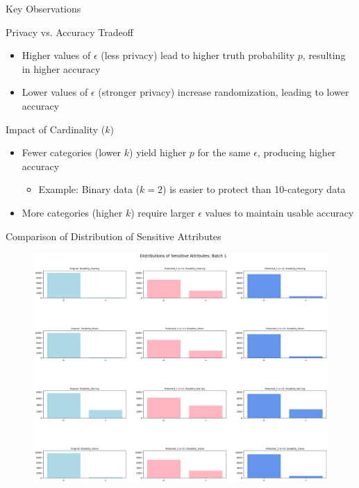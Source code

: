 \documentclass{beamer}
\begin{document}
\begin{frame}{Key Observations}
\footnotesize

\begin{block}{Privacy vs. Accuracy Tradeoff}
\begin{itemize}
\item Higher values of $\epsilon$ (less privacy) lead to higher truth probability $p$, resulting in higher accuracy
\item Lower values of $\epsilon$ (stronger privacy) increase randomization, leading to lower accuracy
\end{itemize}
\end{block}

\begin{block}{Impact of Cardinality ($k$)}
\begin{itemize}
\item Fewer categories (lower $k$) yield higher $p$ for the same $\epsilon$, producing higher accuracy
\begin{itemize}
\item Example: Binary data ($k=2$) is easier to protect than 10-category data
\end{itemize}
\item More categories (higher $k$) require larger $\epsilon$ values to maintain usable accuracy
\end{itemize}
\end{block}
\end{frame}

\begin{frame}{Comparison of Distribution of Sensitive Attributes }
\begin{figure}
    \centering
    \includegraphics[width=1\textwidth]{final_2_1.png}
\end{figure}
\end{frame}
\end{document}
